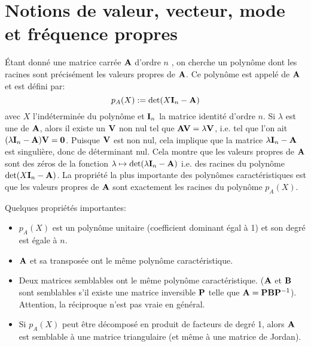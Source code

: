 \medskip
\section{Notions de valeur, vecteur, mode et fréquence propres}

\medskip
Étant donné une matrice carrée $\MM{A}$ d'ordre $n$ ,
on cherche un polynôme dont les racines sont précisément les valeurs propres de $\MM{A}$.
Ce polynôme est appelé 
de $\MM{A}$ et est défini par:
\begin{equation} p_A(X):=\det(X\MM{I}_n-\MM{A})\end{equation}
avec $X$ l'indéterminée du polynôme et $\MM{I}_n$ la matrice identité d'ordre $n$.
\medskipvm
Si $\lambda$ est une  de $\MM{A}$, alors il existe un
 $\VV{V}$ non nul tel que $\MM{A}\VV{V} = \lambda \VV{V}$, i.e.
tel que l'on ait $(\lambda \MM{I}_n-\MM{A})\VV{V} = \VV{0}$.
\medskipvm
Puisque $\VV{V}$ est non nul, cela implique que la matrice $\lambda \MM{I}_n-\MM{A}$ est singulière, donc de déterminant nul.
\medskipvm
Cela montre que les valeurs propres de $\MM{A}$ sont des zéros de la fonction $\lambda\mapsto \det(\lambda \MM{I}_n - \MM{A})$
i.e. des racines du polynôme $\det(X\MM{I}_n-\MM{A})$.
\medskipvm
La propriété la plus importante des polynômes caractéristiques est que
les valeurs propres de $\MM{A}$ sont exactement les racines du polynôme $p_A(X)$.

\medskip
Quelques propriétés importantes:
\begin{itemize}
   \item $p_A(X)$ est un polynôme unitaire (coefficient dominant égal à 1) et son degré
	est égale à $n$.
   \item $\MM{A}$ et sa transposée ont le même polynôme caractéristique.
   \item Deux matrices semblables ont le même polynôme caractéristique. ($\MM{A}$ et $\MM{B}$ sont semblables s'il
	existe une matrice inversible $\MM{P}$ telle que $\MM{A} = \MM{P}\MM{B}\MMI{P}$).
	Attention, la réciproque n'est pas vraie en général.
   \item Si $p_A(X)$ peut être décomposé en produit de facteurs de degré 1, alors $\MM{A}$ est semblable
	à une matrice triangulaire (et même à une matrice de Jordan).
\end{itemize}

